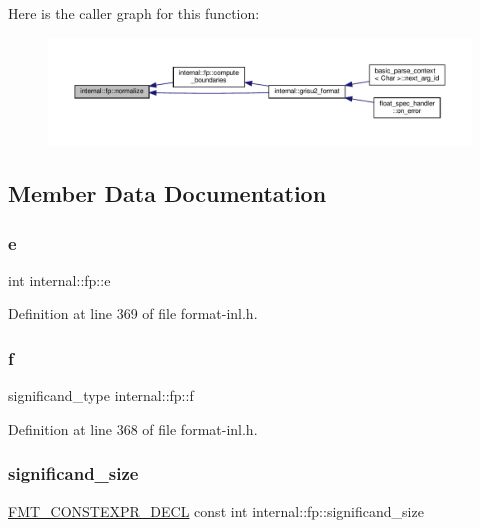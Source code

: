 Here is the caller graph for this function\+:
\nopagebreak
\begin{figure}[H]
\begin{center}
\leavevmode
\includegraphics[width=350pt]{classinternal_1_1fp_ac3c688f71ca6decf9a608680dda8ff23_icgraph}
\end{center}
\end{figure}


\subsection{Member Data Documentation}
\mbox{\label{classinternal_1_1fp_aa68580ec0db366075ec0366dc7a74a34}} 
\subsubsection{\texorpdfstring{e}{e}}
{\footnotesize\ttfamily int internal\+::fp\+::e}



Definition at line 369 of file format-\/inl.\+h.

\mbox{\label{classinternal_1_1fp_a7e1a8d0bebdf6d95582c035034484ab4}} 
\subsubsection{\texorpdfstring{f}{f}}
{\footnotesize\ttfamily significand\+\_\+type internal\+::fp\+::f}



Definition at line 368 of file format-\/inl.\+h.

\mbox{\label{classinternal_1_1fp_a226e27a91febae6a2d1d1501003be2f9}} 
\subsubsection{\texorpdfstring{significand\+\_\+size}{significand\_size}}
{\footnotesize\ttfamily \hyperlink{core_8h_af4388801466a5994a363d6005616371a}{F\+M\+T\+\_\+\+C\+O\+N\+S\+T\+E\+X\+P\+R\+\_\+\+D\+E\+CL} const int internal\+::fp\+::significand\+\_\+size\hspace{0.3cm}{\ttfamily [static]}}

